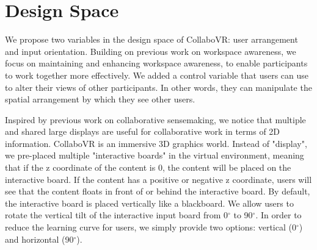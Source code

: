 \documentclass{sigchi}
\begin{document}
\section{Design Space}
We propose two variables in the design space of CollaboVR: user arrangement and input orientation. Building on previous work on workspace awareness, we focus on maintaining and enhancing workspace awareness, to enable participants to work together more effectively. We added a control variable that users can use to alter their views of other participants. In other words, they can manipulate the spatial arrangement by which they see other users. 

Inspired by previous work on collaborative sensemaking, we notice that multiple and shared large displays are useful for collaborative work in terms of 2D information. CollaboVR is an immersive 3D graphics world. Instead of "display", we pre-placed multiple "interactive boards" in the virtual environment, meaning that if the z coordinate of the content is 0, the content will be placed on the interactive board. If the content has a positive or negative z coordinate, users will see that the content floats in front of or behind the interactive board. By default, the interactive board is placed vertically like a blackboard. We allow users to rotate the vertical tilt of the interactive input board from 0$^{\circ}$ to 90$^{\circ}$. In order to reduce the learning curve for users, we simply provide two options: vertical (0$^{\circ}$) and horizontal (90$^{\circ}$).
\end{document}
